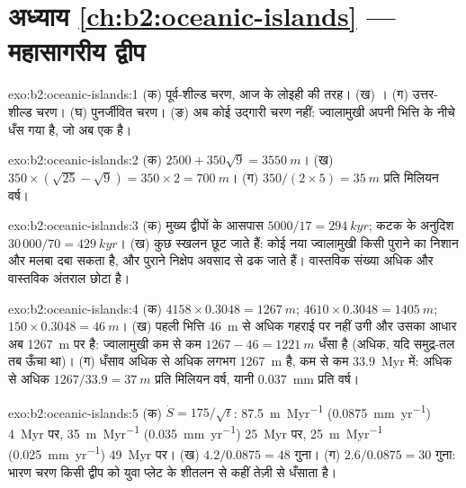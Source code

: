 \section*{अध्याय \ref{ch:b2:oceanic-islands} --- महासागरीय द्वीप}

\begin{solution}{exo:b2:oceanic-islands:1}
(क) पूर्व-शील्ड चरण, आज के लोइही की तरह। (ख) । (ग) उत्तर-शील्ड चरण। (घ) पुनर्जीवित
चरण। (ङ) अब कोई उद्गारी चरण नहीं: ज्वालामुखी अपनी भित्ति के नीचे धँस गया है, जो अब एक  है।
\end{solution}

\begin{solution}{exo:b2:oceanic-islands:2}
(क) $2500 + 350\sqrt9 = \qty{3550}{m}$। (ख) $350\times(\sqrt{25} - \sqrt9) = 350\times2 =
\qty{700}{m}$। (ग) $350/(2\times5) = \qty{35}{m}$ प्रति मिलियन वर्ष।
\end{solution}

\begin{solution}{exo:b2:oceanic-islands:3}
(क) मुख्य द्वीपों के आसपास $5000/17 = \qty{294}{kyr}$; कटक के अनुदिश $30\,000/70 = \qty{429}{kyr}$।
(ख) कुछ स्खलन छूट जाते हैं: कोई नया ज्वालामुखी किसी पुराने का निशान और मलबा दबा सकता है,
और पुराने निक्षेप अवसाद से ढक जाते हैं। वास्तविक संख्या अधिक और वास्तविक अंतराल
छोटा है।
\end{solution}

\begin{solution}{exo:b2:oceanic-islands:4}
(क) $4158\times0.3048 = \qty{1267}{m}$; $4610\times0.3048 = \qty{1405}{m}$; $150\times0.3048 =
\qty{46}{m}$। (ख) पहली भित्ति \qty{46}{m} से अधिक गहराई पर नहीं उगी और उसका आधार अब
\qty{1267}{m} पर है: ज्वालामुखी कम से कम $1267 - 46 = \qty{1221}{m}$ धँसा है (अधिक, यदि समुद्र-तल
तब ऊँचा था)। (ग) धँसाव अधिक से अधिक लगभग \qty{1267}{m} है, कम से कम \qty{33.9}{Myr} में:
अधिक से अधिक $1267/33.9 = \qty{37}{m}$ प्रति मिलियन वर्ष, यानी \qty{0.037}{mm} प्रति वर्ष।
\end{solution}

\begin{solution}{exo:b2:oceanic-islands:5}
(क) $\dot S = 175/\sqrt t$: \qty{87.5}{m.Myr^{-1}} (\qty{0.0875}{mm.yr^{-1}}) \qty{4}{Myr} पर,
\qty{35}{m.Myr^{-1}} (\qty{0.035}{mm.yr^{-1}}) \qty{25}{Myr} पर, \qty{25}{m.Myr^{-1}}
(\qty{0.025}{mm.yr^{-1}}) \qty{49}{Myr} पर। (ख) $4.2/0.0875 = 48$ गुना। (ग) $2.6/0.0875 = 30$
गुना: भारण चरण किसी द्वीप को युवा प्लेट के शीतलन से कहीं तेज़ी से धँसाता है।
\end{solution}

